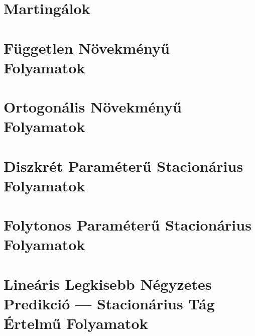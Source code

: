 \documentclass{article}
\begin{document}
\section{Martingálok}\label{sec:martingalok}
\section{Független Növekményű Folyamatok}\label{sec:fuggetlennovekmenyufolyamatok}
\section{Ortogonális Növekményű Folyamatok}\label{sec:ortogonalisnovekmenyufolyamatok}
\section{Diszkrét Paraméterű Stacionárius Folyamatok}\label{sec:diszkretparameterustacionariusfolyamatok}
\section{Folytonos Paraméterű Stacionárius Folyamatok}\label{sec:folytonosparameterustacionariusfolyamatok}
\section{Lineáris Legkisebb Négyzetes Predikció --- Stacionárius Tág Értelmű Folyamatok}\label{sec:llsp}
\end{document}
